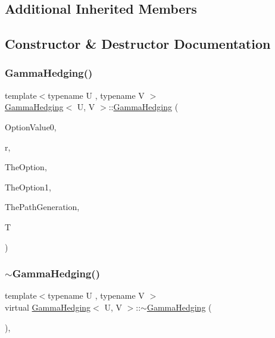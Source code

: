 \subsection*{Additional Inherited Members}


\subsection{Constructor \& Destructor Documentation}
\hypertarget{classGammaHedging_aa93e888fe06bc5ec877364dfaed43f5e}{}\label{classGammaHedging_aa93e888fe06bc5ec877364dfaed43f5e} 
\subsubsection{\texorpdfstring{Gamma\+Hedging()}{GammaHedging()}}
{\footnotesize\ttfamily template$<$typename U , typename V $>$ \\
\hyperlink{classGammaHedging}{Gamma\+Hedging}$<$ U, V $>$\+::\hyperlink{classGammaHedging}{Gamma\+Hedging} (\begin{DoxyParamCaption}\item[{double}]{Option\+Value0,  }\item[{double}]{r,  }\item[{shared\+\_\+ptr$<$ U $>$}]{The\+Option,  }\item[{shared\+\_\+ptr$<$ V $>$}]{The\+Option1,  }\item[{\hyperlink{classPathGenerationGBM}{Path\+Generation\+G\+BM} $\ast$}]{The\+Path\+Generation,  }\item[{double}]{T }\end{DoxyParamCaption})}

\hypertarget{classGammaHedging_ad2d180e1aec52c7e58af34dbf8c7c66e}{}\label{classGammaHedging_ad2d180e1aec52c7e58af34dbf8c7c66e} 
\subsubsection{\texorpdfstring{$\sim$\+Gamma\+Hedging()}{~GammaHedging()}}
{\footnotesize\ttfamily template$<$typename U , typename V $>$ \\
virtual \hyperlink{classGammaHedging}{Gamma\+Hedging}$<$ U, V $>$\+::$\sim$\hyperlink{classGammaHedging}{Gamma\+Hedging} (\begin{DoxyParamCaption}{ }\end{DoxyParamCaption})\hspace{0.3cm}{\ttfamily [inline]}, {\ttfamily [virtual]}}



